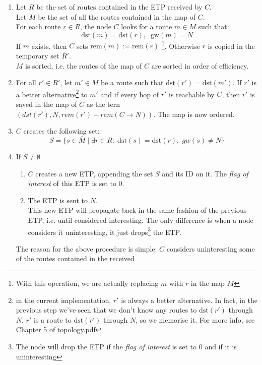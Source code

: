 \documentclass[a4paper]{article}
\newcommand{\T}[1]{\textrm{#1}}
\def\ove#1{{\overline{#1}}}
\def\0{{\emptyset}}
\begin{document}
\begin{description}
\begin{enumerate}
			received ETP, then $C$ immediately drops the ETP and
			skips all the following steps\footnote{This is the acyclic
			rule}.
		\item Let $R$ be the set of routes contained in the
			ETP received by $C$.\\
			Let $M$ be the set of all the routes contained in the map of $C$.\\
		For each route $r\in R$, the node $C$ looks for 
		a route $m\in M$ such that:
		\[\T{dst}(m)=\T{dst}(r),\;\;\T{gw}(m)=N
		\]
		If $m$ exists, then $C$ sets $\T{rem}(m):=\T{rem}(r)$
		\footnote{With this operation, we are actually replacing $m$
		with $r$ in the map $M$}.
		Otherwise $r$ is copied in the temporary set $R'$.\\
		$M$ is sorted, i.e. the routes of the map of $C$ are sorted in
		order of efficiency.
	\item For all $r' \in R'$,
		let $m'\in M$ be a route such that
		$\T{dst}(r')=\T{dst}(m')$. If
		$r'$ is a better alternative\footnote{in the current
		implementation, $r'$ is always a better alternative. In fact,
		in the previous step we've seen that we don't know any routes
		to $\T{dst}(r')$ through $N$. $r'$ is a route to $\T{dst}(r')$
		through $N$, so we memorise it. 	For more info, see Chapter 5 of
		topology.pdf\cite{ntktopology} }
		to $m'$ and if
		every hop of $r'$ is reachable by $C$,
		then $r'$  is saved in the map of $C$ as the
		tern $(dst(r'), N, rem(r')+rem(C\rightarrow
		N))$. The map is now ordered.
	\item $C$ creates the following set:
		\[
		S=\{s\in \ove M\;|\; \exists r\in R:\;\T{dst}(s)=\T{dst}(r),\;gw(s)\neq N\}
		\]
	\item \label{backpropstep}
		If $S\neq \0$
		\begin{enumerate}
			\item $C$ creates a new ETP, appending the set $S$ and its ID on it.
				The \emph{flag of interest} of this ETP is set to 0. 
			\item The ETP is sent to $N$.\\
				This new ETP will propagate back in the
				same fashion of the previous ETP, i.e.
				until considered interesting. The only difference is when a node
				considers it uninteresting, it just drops\footnote{The node will
				drop the ETP if the \emph{flag of interest} is set to 0 and if it is
				uninteresting} the ETP.
		\end{enumerate}
		The reason for the above procedure is simple: $C$ considers
		uninteresting some of the routes contained in the received

\end{enumerate}
\end{description}
\end{document}
